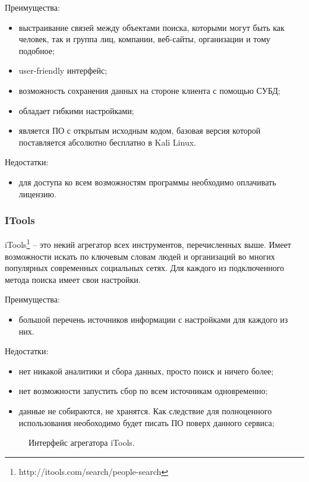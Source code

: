 Преимущества:
\begin{itemize}
    \item выстраивание связей между объектами поиска, которыми могут быть как человек, так и группа лиц, компании, веб-сайты,
    организации и тому подобное;
    \item user-friendly интерфейс;
    \item возможность сохранения данных на стороне клиента с помощью СУБД;
    \item обладает гибкими настройками;
    \item является ПО с открытым исходным кодом, базовая версия которой поставляется абсолютно бесплатно в Kali Linux.
\end{itemize}

Недостатки:
\begin{itemize}
    \item для доступа ко всем возможностям программы необходимо оплачивать лицензию.
\end{itemize}


\subsubsection{ITools}
iTools\footnote{http://itools.com/search/people-search} -- это некий агрегатор всех инструментов, перечисленных выше. Имеет
возможности искать по ключевым словам людей и организаций во многих популярных современных социальных сетях. Для каждого из
подключенного метода поиска имеет свои настройки.

Преимущества:
\begin{itemize}
    \item большой перечень источников информации с настройками для каждого из них.
\end{itemize}

Недостатки:
\begin{itemize}
    \item нет никакой аналитики и сбора данных, просто поиск и ничего более;
    \item нет возможности запустить сбор по всем источникам одновременно;
    \item данные не собираются, не хранятся. Как следствие для полноценного использования необоходимо будет писать ПО поверх
    данного сервиса;
\end{itemize}

\begin{figure}[H]
    \caption{Интерфейс агрегатора iTools.}
    \label{ris:image}
\end{figure}

